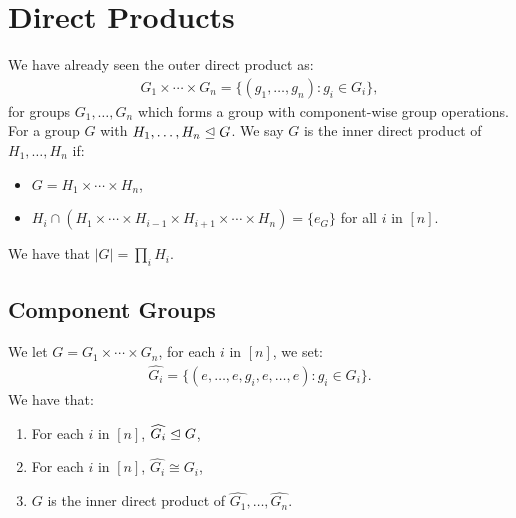 \section{Direct Products}

We have already seen the outer direct product as: \begin{align*}
    G_1 \times \cdots \times G_n = \{(g_1, \ldots, g_n) : g_i \in G_i\},
\end{align*} for groups $G_1, \ldots, G_n$ which forms a group with
component-wise group operations.
\\[\baselineskip]
For a group $G$ with $H_1, \ldots, H_n \trianglelefteq G$. We say $G$ is the
inner direct product of $H_1, \ldots, H_n$ if: \begin{itemize}
    \item $G = H_1 \times \cdots \times H_n$,
    \item $H_i \cap (H_1 \times \cdots \times H_{i - 1} 
        \times H_{i + 1} \times \cdots \times H_n) = \{e_G\}$ 
        for all $i$ in $[n]$.  
\end{itemize} We have that $|G| = \prod_i H_i$.

\subsection{Component Groups}

We let $G = G_1 \times \cdots \times G_n$, for each $i$ in $[n]$, we
set: \begin{align*}
    \widehat{G_i} = \{(e, \ldots, e, g_i, e, \ldots, e) : g_i \in G_i\}.
\end{align*} We have that: \begin{enumerate}
    \item For each $i$ in $[n]$, $\widehat{G_i} \trianglelefteq G$,
    \item For each $i$ in $[n]$, $\widehat{G_i} \cong G_i$,
    \item $G$ is the inner direct product of 
        $\widehat{G_1}, \ldots, \widehat{G_n}$.
\end{enumerate}

